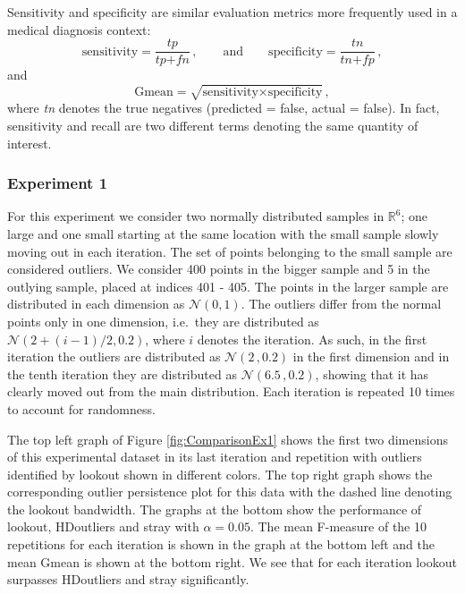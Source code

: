 \documentclass[11pt,a4paper,]{article}
\theoremstyle{definition}
\theoremstyle{definition}
\theoremstyle{definition}
\theoremstyle{remark}
\begin{document}
Sensitivity and specificity are similar evaluation metrics more frequently used in a medical diagnosis context:
\begin{equation}\label{eq:ss}
    \text{sensitivity} =  \frac{ \textit{tp} }{\textit{tp} + \textit{fn}} \, ,  \qquad \text{and} \qquad \text{specificity} = \frac{\textit{tn}}{\textit{tn} + \textit{fp}} \, ,
\end{equation}
and
\begin{equation}\label{eq:gmean}
    \text{Gmean} =  \sqrt{ \text{sensitivity} \times \text{specificity}} \, , 
\end{equation}
where \emph{tn} denotes the true negatives (predicted = false, actual = false). In fact, sensitivity and recall are two different terms denoting the same quantity of interest.

\hypertarget{experiment-1}{%
\subsubsection{\texorpdfstring{Experiment 1 \label{sec:exp1}}{Experiment 1 }}\label{experiment-1}}

For this experiment we consider two normally distributed samples in \(\mathbb{R}^6\); one large and one small starting at the same location with the small sample slowly moving out in each iteration. The set of points belonging to the small sample are considered outliers. We consider 400 points in the bigger sample and 5 in the outlying sample, placed at indices 401 - 405. The points in the larger sample are distributed in each dimension as \(\mathcal{N}(0, 1)\). The outliers differ from the normal points only in one dimension, i.e.~they are distributed as \(\mathcal{N}\left(2 + (i-1)/2, 0.2 \right)\), where \(i\) denotes the iteration. As such, in the first iteration the outliers are distributed as \(\mathcal{N}\left(2 \, , 0.2 \right)\) in the first dimension and in the tenth iteration they are distributed as \(\mathcal{N}\left(6.5 \, , 0.2 \right)\), showing that it has clearly moved out from the main distribution. Each iteration is repeated 10 times to account for randomness.

The top left graph of Figure \ref{fig:ComparisonEx1} shows the first two dimensions of this experimental dataset in its last iteration and repetition with outliers identified by lookout shown in different colors. The top right graph shows the corresponding outlier persistence plot for this data with the dashed line denoting the lookout bandwidth. The graphs at the bottom show the performance of lookout, HDoutliers and stray with \(\alpha = 0.05\). The mean F-measure of the 10 repetitions for each iteration is shown in the graph at the bottom left and the mean Gmean is shown at the bottom right. We see that for each iteration lookout surpasses HDoutliers and stray significantly.
\end{document}
